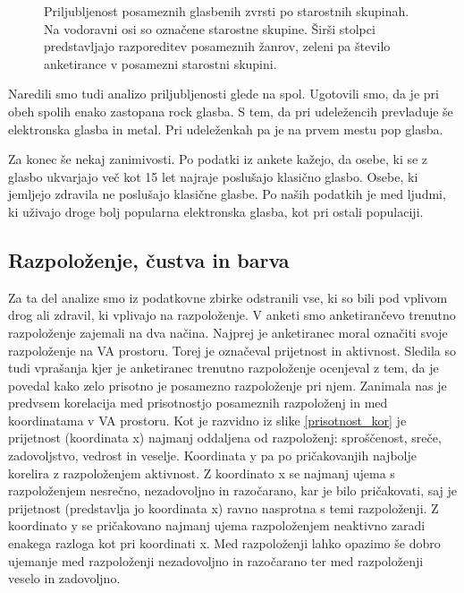 \documentclass[a4paper, 12pt]{book}
\begin{document}
{\begin{figure}[hbt]
\caption{Priljubljenost posameznih glasbenih zvrsti po starostnih skupinah. Na vodoravni osi so označene starostne skupine. Širši stolpci predstavljajo razporeditev posameznih žanrov, zeleni pa število anketirance v posamezni starostni skupini.  }
\label{zanrigraftop}
\end{figure}

Naredili smo tudi analizo priljubljenosti glede na spol. Ugotovili smo, da je pri obeh spolih enako zastopana rock glasba. S tem, da pri udeležencih prevladuje še elektronska glasba in metal. Pri udeleženkah pa je na prvem mestu pop glasba. 

Za konec še nekaj zanimivosti. Po podatki iz ankete kažejo, da osebe, ki se z glasbo ukvarjajo več kot 15 let najraje poslušajo klasično glasbo. Osebe, ki jemljejo zdravila ne poslušajo klasične glasbe. Po naših podatkih je med ljudmi, ki uživajo droge bolj popularna elektronska glasba, kot pri ostali populaciji.

\subsection{Razpoloženje, čustva in barva}

Za ta del analize smo iz podatkovne zbirke odstranili vse, ki so bili pod vplivom drog ali zdravil, ki vplivajo na razpoloženje. V anketi smo anketirančevo trenutno razpoloženje zajemali na dva načina. Najprej je anketiranec moral označiti svoje razpoloženje na VA prostoru. Torej je označeval prijetnost in aktivnost. Sledila so tudi vprašanja kjer je anketiranec trenutno razpoloženje ocenjeval z tem, da je povedal kako zelo prisotno je posamezno razpoloženje pri njem. Zanimala nas je predvsem korelacija med prisotnostjo posameznih razpoloženj in med koordinatama v VA prostoru. Kot je razvidno iz slike \ref{prisotnost_kor} je prijetnost (koordinata x) najmanj oddaljena od razpoloženj: sproščenost, sreče, zadovoljstvo, vedrost in veselje. Koordinata y pa po pričakovanjih najbolje korelira z razpoloženjem aktivnost. Z koordinato  x se najmanj ujema s razpoloženjem nesrečno, nezadovoljno in razočarano, kar je bilo pričakovati, saj je prijetnost (predstavlja jo koordinata x) ravno nasprotna s temi razpoloženji. Z koordinato y se pričakovano najmanj ujema razpoloženjem neaktivno zaradi enakega razloga kot pri koordinati x. Med razpoloženji lahko opazimo še dobro ujemanje med razpoloženji nezadovoljno in razočarano ter med razpoloženji veselo in zadovoljno. 

}
\end{document}
